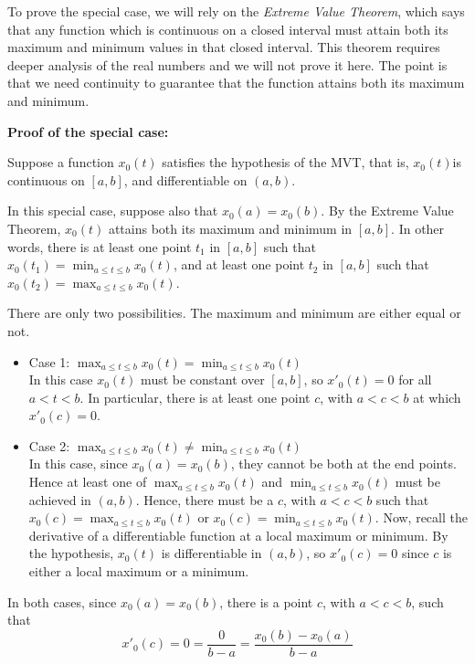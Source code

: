 \documentclass[pdftex, brazil, 12pt, twoside]{article}
\begin{document}
To prove the special case, we will rely on the \emph{Extreme Value Theorem}, which says
that any function which is continuous on a closed interval must attain both its
maximum and minimum values in that closed interval. This theorem requires deeper analysis
of the real numbers and we will not prove it here. The point is that we need continuity
to guarantee that the function attains both its maximum and minimum.

\textbf{Proof of the special case:}

Suppose a function $x_0(t)$ satisfies the hypothesis of the MVT, that is,
$x_0(t)$is continuous on $[a, b]$, and differentiable on $(a, b)$.

In this special case, suppose also that $x_0(a) = x_0(b)$. By the Extreme Value Theorem,
$x_0(t)$ attains both its maximum and minimum in $[a, b]$. In other words, there is at
least one point $t_1$ in $[a, b]$ such that $\displaystyle x_0(t_1) = \min_{a \le t \le b}x_0(t)$,
and at least one point $t_2$ in $[a, b]$ such that $\displaystyle x_0(t_2) = \max_{a \le t \le b}x_0(t)$.

There are only two possibilities. The maximum and minimum are either equal or not.

\begin{itemize}
\item Case 1: $\displaystyle \max_{a \le t \le b}x_0(t) = \min_{a \le t \le b}x_0(t)$\\
  In this case $x_0(t)$ must be constant over $[a, b]$, so $x'_0(t) = 0$ for all
  $a < t < b$. In particular, there is at least one point $c$, with $a < c < b$ at
  which $x'_0(c) = 0$. 
\item Case 2: $\displaystyle \max_{a \le t \le b}x_0(t) \ne \min_{a \le t \le b}x_0(t)$\\
  In this case, since $x_0(a) = x_0(b)$, they cannot be both at the end points.
  Hence at least one of $\displaystyle \max_{a \le t \le b}x_0(t)$ and $\displaystyle \min_{a \le t \le b}x_0(t)$
  must be achieved in $(a, b)$. Hence, there must be a $c$, with $a < c < b$ such that
  $\displaystyle x_0(c) = \max_{a \le t \le b}x_0(t)$ or $\displaystyle x_0(c) = \min_{a \le t \le b}x_0(t)$.
  Now, recall the derivative of a differentiable function at a local maximum or minimum.
  By the hypothesis, $x_0(t)$ is differentiable in $(a, b)$, so $x'_0(c) = 0$ since
  $c$ is either a local maximum or a minimum.
\end{itemize}

In both cases, since $x_0(a) = x_0(b)$, there is a point $c$, with $a < c < b$, such that
\begin{equation}
  x'_0(c) = 0 = \frac{0}{b-a} = \frac{x_0(b) - x_0(a)}{b-a}
\end{equation}
\end{document}
